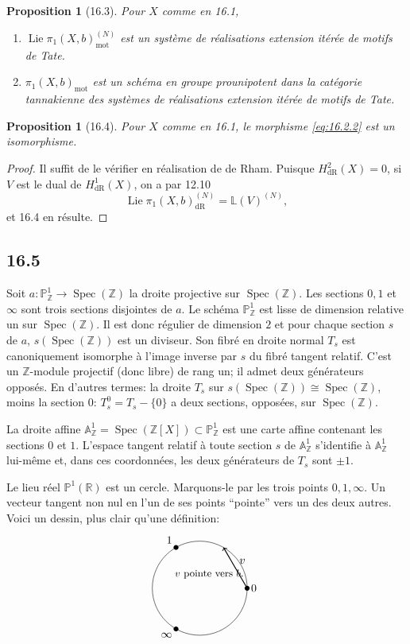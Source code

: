 \documentclass[12pt,a4paper]{article}
\theoremstyle{plain}
\newtheorem{proposition}[theorem]{Proposition}
\theoremstyle{definition}
\theoremstyle{remark}
\DeclareMathOperator{\Spec}{Spec}
\DeclareMathOperator{\Lie}{Lie}
\newcommand{\bZ}{\mathbb{Z}}
\newcommand{\bR}{\mathbb{R}}
\newcommand{\bP}{\mathbb{P}}
\newcommand{\bA}{\mathbb{A}}
\newcommand{\LL}{\mathbb{L}}
\newcommand{\dr}{\mathrm{dR}}
\newcommand{\mot}{\mathrm{mot}}
\begin{document}
\begin{proposition}[16.3]
Pour $X$ comme en 16.1,
\begin{enumerate}[label=(\roman*), nosep]
\item $\Lie \pi_1(X, b)_{\mot}^{(N)}$ est un système de réalisations extension itérée de motifs de Tate.
\item $\pi_1(X, b)_{\mot}$ est un schéma en groupe prounipotent dans la catégorie tannakienne des systèmes de réalisations extension itérée de motifs de Tate.
\end{enumerate}
\end{proposition}

\begin{proposition}[16.4]
Pour $X$ comme en 16.1, le morphisme \eqref{eq:16.2.2} est un isomorphisme.
\end{proposition}

\begin{proof}
Il suffit de le vérifier en réalisation de de Rham. Puisque $H_{\dr}^2(X) = 0$, si $V$ est le dual de $H_{\dr}^1(X)$, on a par 12.10
\[
\Lie \pi_1(X, b)_{\dr}^{(N)} = \LL(V)^{(N)},
\]
et 16.4 en résulte.
\end{proof}

\subsection*{16.5}

Soit $a: \bP^1_{\bZ} \to \Spec(\bZ)$ la droite projective sur $\Spec(\bZ)$. Les sections $0, 1$ et $\infty$ sont trois sections disjointes de $a$. Le schéma $\bP^1_{\bZ}$ est lisse de dimension relative un sur $\Spec(\bZ)$. Il est donc régulier de dimension $2$ et pour chaque section $s$ de $a$, $s(\Spec(\bZ))$ est un diviseur. Son fibré en droite normal $T_s$ est canoniquement isomorphe à l'image inverse par $s$ du fibré tangent relatif. C'est un $\bZ$-module projectif (donc libre) de rang un; il admet deux générateurs opposés. En d'autres termes: la droite $T_s$ sur $s(\Spec(\bZ)) \cong \Spec(\bZ)$, moins la section $0$: $T_s^0 = T_s - \{0\}$ a deux sections, opposées, sur $\Spec(\bZ)$.

La droite affine $\bA^1_{\bZ} = \Spec(\bZ[X]) \subset \bP^1_{\bZ}$ est une carte affine contenant les sections $0$ et $1$. L'espace tangent relatif à toute section $s$ de $\bA^1_{\bZ}$ s'identifie à $\bA^1_{\bZ}$ lui-même et, dans ces coordonnées, les deux générateurs de $T_s$ sont $\pm 1$.

Le lieu réel $\bP^1(\bR)$ est un cercle. Marquons-le par les trois points $0, 1, \infty$. Un vecteur tangent non nul en l'un de ses points ``pointe'' vers un des deux autres. Voici un dessin, plus clair qu'une définition:
\[
\begin{tikzpicture}[scale=1.5]
\draw (0,0) circle (1cm);
\fill (1,0) circle (1.5pt) node[right] {$0$};
\fill (-0.5,0.866) circle (1.5pt) node[above left] {$1$};
\fill (-0.5,-0.866) circle (1.5pt) node[below left] {$\infty$};
\draw[->,thick] (1,0) -- (0.5,0.866) node[midway,above right] {$v$};
\node at (0.2,0.3) {\small $v$ pointe vers $b$.};
\end{tikzpicture}
\]
\end{document}
